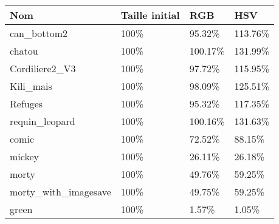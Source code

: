 \documentclass[12pt, letterpaper]{article}
\begin{document}
\begin{tabular}{l|l|l|l}
  Nom  & Taille initial & RGB & HSV\\
  \hline  
  can\_bottom2 & 100\% & 95.32\% & 113.76\% \\
  \hline
  chatou & 100\% & 100.17\% & 131.99\% \\
  \hline
  Cordiliere2\_V3 & 100\% & 97.72\% & 115.95\% \\
  \hline
  Kili\_mais & 100\% & 98.09\% & 125.51\%  \\
  \hline
  Refuges & 100\% & 95.32\% & 117.35\% \\
  \hline
  requin\_leopard & 100\% & 100.16\% & 131.63\% \\
  \hline
  comic & 100\% & 72.52\% & 88.15\% \\
  \hline
  mickey & 100\% & 26.11\% & 26.18\%\\
  \hline
  morty & 100\% & 49.76\% & 59.25\% \\
  \hline
  morty\_with\_imagesave & 100\% & 49.75\% & 59.25\% \\
  \hline
  green & 100\% & 1.57\% & 1.05\% \\
\end{tabular}
\end{document}
